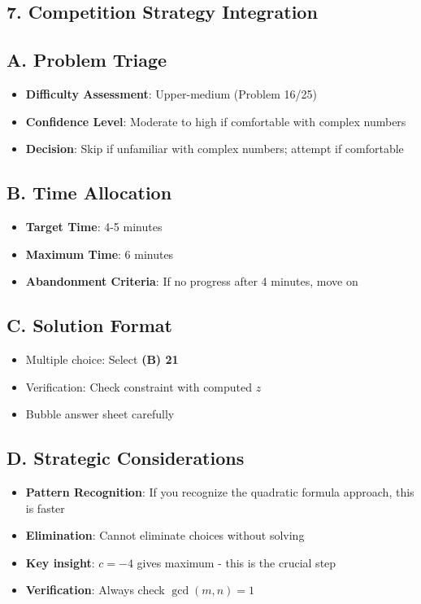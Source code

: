 \documentclass[11pt]{article}
\begin{document}
\begin{competitionbox}
\section*{7. Competition Strategy Integration}

\subsection*{A. Problem Triage}
\begin{itemize}[leftmargin=*]
    \item \textbf{Difficulty Assessment}: Upper-medium (Problem 16/25)
    \item \textbf{Confidence Level}: Moderate to high if comfortable with complex numbers
    \item \textbf{Decision}: Skip if unfamiliar with complex numbers; attempt if comfortable
\end{itemize}

\subsection*{B. Time Allocation}
\begin{itemize}[leftmargin=*]
    \item \textbf{Target Time}: 4-5 minutes
    \item \textbf{Maximum Time}: 6 minutes
    \item \textbf{Abandonment Criteria}: If no progress after 4 minutes, move on
\end{itemize}

\subsection*{C. Solution Format}
\begin{itemize}[leftmargin=*]
    \item Multiple choice: Select \textbf{(B) 21}
    \item Verification: Check constraint with computed $z$
    \item Bubble answer sheet carefully
\end{itemize}

\subsection*{D. Strategic Considerations}
\begin{itemize}[leftmargin=*]
    \item \textbf{Pattern Recognition}: If you recognize the quadratic formula approach, this is faster
    \item \textbf{Elimination}: Cannot eliminate choices without solving
    \item \textbf{Key insight}: $c = -4$ gives maximum - this is the crucial step
    \item \textbf{Verification}: Always check $\gcd(m,n) = 1$
\end{itemize}
\end{competitionbox}
\end{document}
